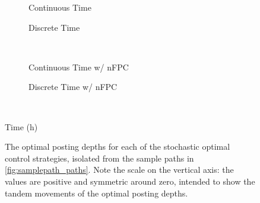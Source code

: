 \begin{figure}%
\centering%
\begin{subfigure}[b]{.4\linewidth}%
  \centering%
  \setlength\figureheight{\linewidth}%
  \setlength\figurewidth{\linewidth}%
  \caption{Continuous Time}%
\end{subfigure}%
\hspace{1.5cm}%
\begin{subfigure}[b]{.4\linewidth}%
  \setlength\figureheight{\linewidth}%
  \setlength\figurewidth{\linewidth}%
  \caption{Discrete Time}%
\end{subfigure}\\%
\vspace{1cm}%
\begin{subfigure}[b]{.4\linewidth}%
  \setlength\figureheight{\linewidth}%
  \setlength\figurewidth{\linewidth}%
  \caption{Continuous Time w/ nFPC}%
\end{subfigure}%
\hspace{1.5cm}%
\begin{subfigure}[b]{.4\linewidth}%
  \setlength\figureheight{\linewidth}%
  \setlength\figurewidth{\linewidth}%
  \caption{Discrete Time w/ nFPC}%
\end{subfigure}\\%
\leavevmode{}\hspace{0pt plus 1filll}\null%

Time (h)

\vspace{1cm}%
  \caption[Comparison of optimal posting depths on the sample path]{The optimal posting depths for each of the stochastic optimal control strategies, isolated from the sample paths in \autoref{fig:samplepath_paths}. Note the scale on the vertical axis: the values are positive and symmetric around zero, intended to show the tandem movements of the optimal posting depths.}\label{fig:samplepath_depths}%
\end{figure}

